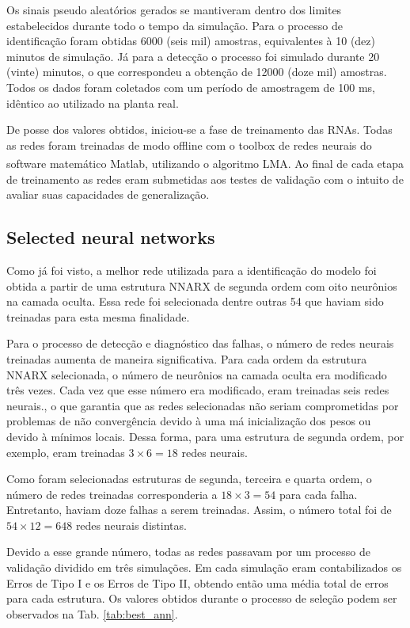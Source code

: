 \documentclass[10pt,fleqn,a4paper]{article}
\newcommand{\reg}{\textsuperscript{\textregistered}}
\begin{document}
Os sinais pseudo aleatórios gerados se mantiveram dentro dos limites
estabelecidos durante todo o tempo da simulação. Para o processo de
identificação foram obtidas 6000 (seis mil) amostras, equivalentes à 10 (dez)
minutos de simulação. Já para a detecção o processo foi simulado durante 20
(vinte) minutos, o que correspondeu a obtenção de 12000 (doze mil) amostras.
Todos os dados foram coletados com um período de amostragem de 100 ms, idêntico
ao utilizado na planta real.

De posse dos valores obtidos, iniciou-se a fase de treinamento das RNAs. Todas
as redes foram treinadas de modo offline com o toolbox de redes neurais do
software matemático Matlab\reg, utilizando o algoritmo LMA. Ao final de cada etapa
de treinamento as redes eram submetidas aos testes de validação com o intuito de
avaliar suas capacidades de generalização.

\subsection{Selected neural networks}
Como já foi visto, a melhor rede utilizada para a identificação do modelo foi
obtida a partir de uma estrutura NNARX de segunda ordem com oito neurônios na
camada oculta. Essa rede foi selecionada dentre outras 54 que haviam sido
treinadas para esta mesma finalidade.

Para o processo de detecção e diagnóstico das falhas, o número de redes neurais
treinadas aumenta de maneira significativa. Para cada ordem da estrutura NNARX
selecionada, o número de neurônios na camada oculta era modificado três vezes.
Cada vez que esse número era modificado, eram treinadas seis redes neurais., o
que garantia que as redes selecionadas não seriam comprometidas por problemas de
não convergência devido à uma má inicialização dos pesos ou devido à mínimos
locais. Dessa forma, para uma estrutura de segunda ordem, por exemplo, eram
treinadas $3 \times 6 = 18$ redes neurais.  

Como foram selecionadas estruturas de segunda, terceira e quarta ordem, o número
de redes treinadas corresponderia a $18 \times 3 = 54$ para cada falha.
Entretanto, haviam doze falhas a serem treinadas. Assim, o número total foi de
$54 \times 12 = 648$ redes neurais distintas.

Devido a esse grande número, todas as redes passavam por um processo de
validação dividido em três simulações. Em cada simulação eram contabilizados os
Erros de Tipo I e os Erros de Tipo II, obtendo então uma média total de erros
para cada estrutura. Os valores obtidos durante o processo de seleção podem ser
observados na Tab. \ref{tab:best_ann}.
\end{document}
